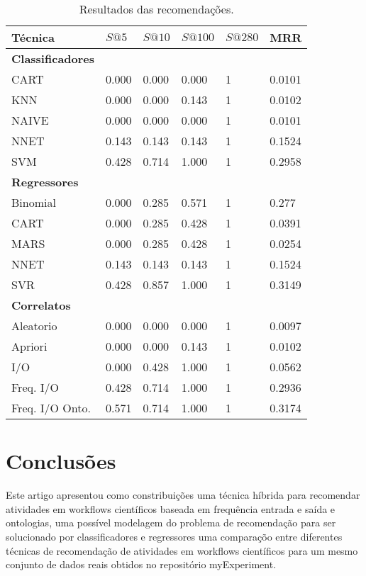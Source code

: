 \documentclass{acm_proc_article-sp}
\begin{document}
\begin{table}
\centering
\caption{Resultados das recomenda\c{c}{\~o}es.}
\label{TAB_RESULTADOS}

\begin{tabular}{|l|l|l|l|l|l|} \hline
\textbf{T{\'e}cnica} & \textbf{\(S@5\)} & \textbf{\(S@10\)} & \textbf{\(S@100\)} & \textbf{\(S@280\)} & \textbf{MRR} \\ \hline
\textbf{Classificadores} &&&&& \\ \hline
CART 								&	0.000	&	0.000	&	0.000	&	1	&	0.0101	\\ \hline
KNN 								&	0.000	&	0.000	&	0.143	&	1	&	0.0102	\\ \hline
NAIVE 								&	0.000	&	0.000	&	0.000	&	1	&	0.0101	\\ \hline
NNET 								&	0.143	&	0.143	&	0.143	&	1	&	0.1524	\\ \hline
SVM 								&	0.428	&	0.714	&	1.000	&	1	&	0.2958	\\ \hline
\textbf{Regressores} &&&&& \\ \hline
Binomial 							&	0.000	&	0.285	&	0.571	&	1	&	0.277	\\ \hline
CART 								&	0.000	&	0.285	&	0.428	&	1	&	0.0391	\\ \hline
MARS 								&	0.000	&	0.285	&	0.428	&	1	&	0.0254	\\ \hline
NNET 								&	0.143	&	0.143	&	0.143	&	1	&	0.1524	\\ \hline
SVR 								&	0.428	&	0.857	&	1.000	&	1	&	0.3149	\\ \hline
\textbf{Correlatos} &&&&& \\ \hline
Aleatorio							&	0.000	&	0.000	&	0.000	&	1	&	0.0097	\\ \hline
Apriori								&	0.000	&	0.000	&	0.143	&	1	&	0.0102	\\ \hline
I/O									&	0.000	&	0.428	&	1.000	&	1	&	0.0562	\\ \hline
Freq. I/O							&	0.428	&	0.714	&	1.000	&	1	&	0.2936	\\ \hline
Freq. I/O Onto.						&	0.571	&	0.714	&	1.000	&	1	&	0.3174	\\ 
\hline\end{tabular}
\end{table}


\section{Conclus{\~o}es}\label{CONCLUSOES}
Este artigo apresentou como constribui\c{c}{\~o}es uma t{\'e}cnica h{\'i}brida para recomendar atividades em workflows cient{\'i}ficos baseada em frequ{\^e}ncia entrada e sa{\'i}da e ontologias, uma poss{\'i}vel modelagem do problema de recomenda\c{c}{\~a}o para ser solucionado por classificadores e regressores uma compara\c{c}{\~o}o entre diferentes t{\'e}cnicas de recomenda\c{c}{\~a}o de atividades em workflows cient{\'i}ficos para um mesmo conjunto de dados reais obtidos no reposit{\'o}rio myExperiment. 
\end{document}
